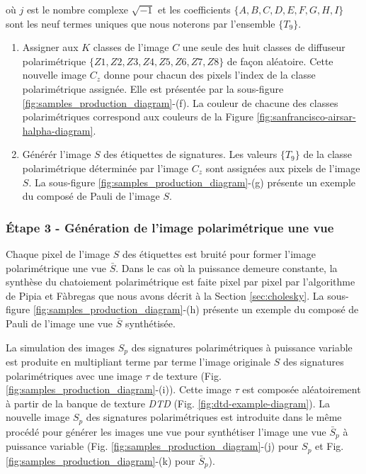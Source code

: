 où $j$ est le nombre complexe $\sqrt{-1}$ et les coefficients $\{A, B, C, D, E, F, G, H , I\}$ sont les neuf termes uniques que nous noterons par l'ensemble $\{T_9\}$.

\begin{enumerate}
    \item Assigner aux $K$ classes de l'image $C$ une seule des huit classes de diffuseur polarimétrique $\{Z1, Z2, Z3, Z4, Z5, Z6, Z7, Z8\}$ de façon aléatoire. Cette nouvelle image $C_z$ donne pour chacun des pixels l'index de la classe polarimétrique assignée.  Elle est présentée par la sous-figure \ref{fig:samples_production_diagram}-(f).  La couleur de chacune des classes polarimétriques correspond aux couleurs de la Figure \ref{fig:sanfrancisco-airsar-halpha-diagram}. 
    \item Générér l'image $S$ des étiquettes de signatures.  Les valeurs $\{T_9\}$ de la classe polarimétrique déterminée par l'image $C_z$ sont assignées aux pixels de l'image $S$.  La sous-figure \ref{fig:samples_production_diagram}-(g) présente un exemple du composé de Pauli de l'image $S$.
\end{enumerate}

\subsubsection{Étape 3 - Génération de l'image polarimétrique une vue}

Chaque pixel de l'image $S$ des étiquettes est bruité pour former l'image polarimétrique une vue $\bar{S}$.  Dans le cas où la puissance demeure constante, la synthèse du chatoiement polarimétrique est faite pixel par pixel par l'algorithme de Pipia et Fàbregas \cite{PolsarSim} que nous avons décrit à la Section \ref{sec:cholesky}. La sous-figure \ref{fig:samples_production_diagram}-(h) présente un exemple du composé de Pauli de l'image une vue $\bar{S}$ synthétisée.

La simulation des images $S_p$ des signatures polarimétriques à puissance variable est produite en multipliant terme par terme l'image originale $S$ des signatures polarimétriques avec une image $\tau$ de texture (Fig. \ref{fig:samples_production_diagram}-(i)).  Cette image  $\tau$ est composée aléatoirement à partir de la banque de texture \textit{DTD} \cite{cimpoi14describing} (Fig. \ref{fig:dtd-example-diagram}). La nouvelle image $S_p$ des signatures polarimétriques est introduite dans le même procédé pour générer les images une vue pour synthétiser l'image une vue $\bar{S}_p$ à puissance variable  (Fig. \ref{fig:samples_production_diagram}-(j) pour $S_p$ et Fig. \ref{fig:samples_production_diagram}-(k) pour $\bar{S}_p$). 

